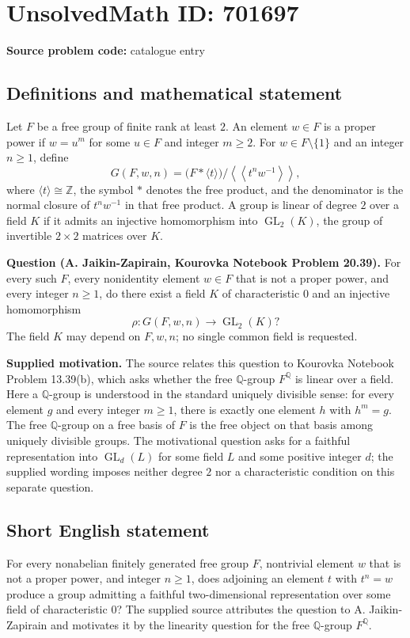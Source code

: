 \documentclass[11pt]{article}
\newcommand{\Z}{\mathbb{Z}}
\newcommand{\Q}{\mathbb{Q}}
\begin{document}
\section*{UnsolvedMath ID: 701697}
\textbf{Source problem code:} catalogue entry
\subsection{Definitions and mathematical statement}
Let \(F\) be a free group of finite rank at least \(2\). An element \(w\in F\) is a proper power if \(w=u^m\) for some \(u\in F\) and integer \(m\ge 2\). For \(w\in F\setminus\{1\}\) and an integer \(n\ge 1\), define
\[
G(F,w,n)=\bigl(F*\langle t\rangle\bigr)\big/\left\langle\!\left\langle t^n w^{-1}\right\rangle\!\right\rangle,
\]
where \(\langle t\rangle\cong\Z\), the symbol \(*\) denotes the free product, and the denominator is the normal closure of \(t^n w^{-1}\) in that free product. A group is linear of degree \(2\) over a field \(K\) if it admits an injective homomorphism into \(\operatorname{GL}_2(K)\), the group of invertible \(2\times2\) matrices over \(K\).

\textbf{Question (A. Jaikin-Zapirain, Kourovka Notebook Problem 20.39).} For every such \(F\), every nonidentity element \(w\in F\) that is not a proper power, and every integer \(n\ge 1\), do there exist a field \(K\) of characteristic \(0\) and an injective homomorphism
\[
\rho:G(F,w,n)\longrightarrow\operatorname{GL}_2(K)?
\]
The field \(K\) may depend on \(F,w,n\); no single common field is requested.

\textbf{Supplied motivation.} The source relates this question to Kourovka Notebook Problem 13.39(b), which asks whether the free \(\Q\)-group \(F^{\Q}\) is linear over a field. Here a \(\Q\)-group is understood in the standard uniquely divisible sense: for every element \(g\) and every integer \(m\ge1\), there is exactly one element \(h\) with \(h^m=g\). The free \(\Q\)-group on a free basis of \(F\) is the free object on that basis among uniquely divisible groups. The motivational question asks for a faithful representation into \(\operatorname{GL}_d(L)\) for some field \(L\) and some positive integer \(d\); the supplied wording imposes neither degree \(2\) nor a characteristic condition on this separate question.
\subsection{Short English statement}
For every nonabelian finitely generated free group \(F\), nontrivial element \(w\) that is not a proper power, and integer \(n\ge1\), does adjoining an element \(t\) with \(t^n=w\) produce a group admitting a faithful two-dimensional representation over some field of characteristic \(0\)? The supplied source attributes the question to A. Jaikin-Zapirain and motivates it by the linearity question for the free \(\Q\)-group \(F^{\Q}\).
\end{document}
